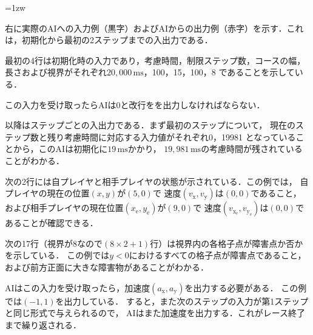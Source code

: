 \documentclass[11pt]{jarticle}
\begin{document}
\begin{minipage}[t]{.6\textwidth}

\parindent=1zw

右に実際のAIへの入力例（黒字）およびAIからの出力例（赤字）を示す．これは，初期化から最初の2ステップまでの入出力である．

最初の4行は初期化時の入力であり，考慮時間，制限ステップ数，コースの幅，
長さおよび視界がそれぞれ$20,000\,\si{\milli\second}$，100，15，100，8
であることを示している．

この入力を受け取ったらAIは0と改行をを出力しなければならない．

以降はステップごとの入出力である．まず最初のステップについて，
現在のステップ数と残り考慮時間に対応する入力値がそれぞれ0，19981
となっていることから，このAIは初期化に$19\,\si{\milli\second}$かかり，
$19,981\,\si{\milli\second}$の考慮時間が残されていることがわかる．

次の2行には自プレイヤと相手プレイヤの状態が示されている．この例では，
自プレイヤの現在の位置$(x,y)$が$(5,0)$で
速度$(v_\mathrm{x},v_\mathrm{y})$は$(0,0)$であること，
および相手プレイヤの現在位置$(x_\mathrm{e},y_\mathrm{e})$が$(9,0)$で
速度$(v_{\mathrm{x}_\mathrm{e}},v_{\mathrm{y}_\mathrm{e}})$は$(0,0)$であることが確認できる．

次の17行（視界が$8$なので$(8 \times 2 + 1)$行）は視界内の各格子点が障害点か否かを示している．
この例では$y < 0$におけるすべての格子点が障害点であること，
および前方正面に大きな障害物があることがわかる．

AIはこの入力を受け取ったら，加速度$(a_\mathrm{x}, a_\mathrm{y})$を出力する必要がある．
この例では$(-1, 1)$を出力している．
すると，また次のステップの入力が第1ステップと同じ形式で与えられるので，
AIはまた加速度を出力する．これがレース終了まで繰り返される．

\end{minipage}
\hfill
\end{document}
